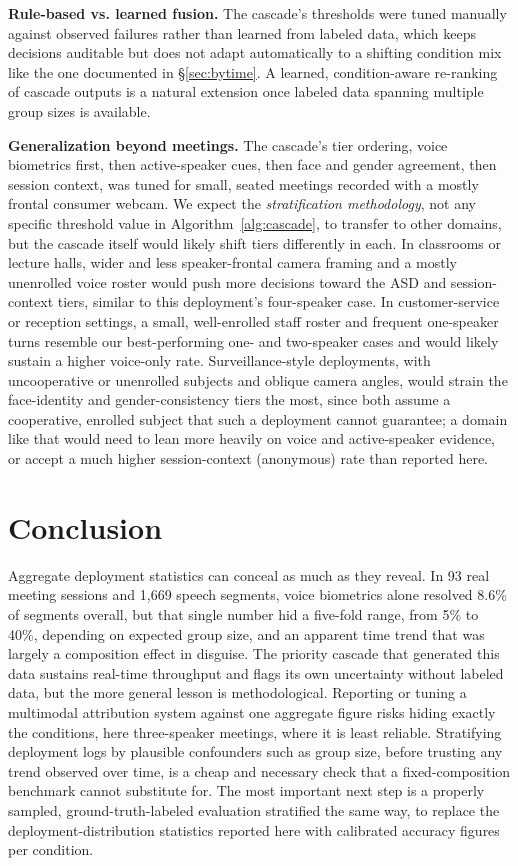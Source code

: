 \documentclass[conference,a4paper]{IEEEtran}
\begin{document}
\textbf{Rule-based vs. learned fusion.} The cascade's thresholds were
tuned manually against observed failures rather than learned from
labeled data, which keeps decisions auditable but does not adapt
automatically to a shifting condition mix like the one documented in
\S\ref{sec:bytime}. A learned, condition-aware re-ranking of cascade
outputs is a natural extension once labeled data spanning multiple
group sizes is available.

\textbf{Generalization beyond meetings.} The cascade's tier ordering,
voice biometrics first, then active-speaker cues, then face and
gender agreement, then session context, was tuned for small, seated
meetings recorded with a mostly frontal consumer webcam. We expect the
\emph{stratification methodology}, not any specific threshold value in
Algorithm~\ref{alg:cascade}, to transfer to other domains, but the
cascade itself would likely shift tiers differently in each. In
classrooms or lecture halls, wider and less speaker-frontal camera
framing and a mostly unenrolled voice roster would push more decisions
toward the ASD and session-context tiers, similar to this deployment's
four-speaker case. In customer-service or reception settings, a small,
well-enrolled staff roster and frequent one-speaker turns resemble our
best-performing one- and two-speaker cases and would likely sustain a
higher voice-only rate. Surveillance-style deployments, with
uncooperative or unenrolled subjects and oblique camera angles, would
strain the face-identity and gender-consistency tiers the most, since
both assume a cooperative, enrolled subject that such a deployment
cannot guarantee; a domain like that would need to lean more heavily
on voice and active-speaker evidence, or accept a much higher
session-context (anonymous) rate than reported here.

\section{Conclusion}

Aggregate deployment statistics can conceal as much as they reveal. In
93 real meeting sessions and 1{,}669 speech segments, voice biometrics
alone resolved 8.6\% of segments overall, but that single number hid a
five-fold range, from 5\% to 40\%, depending on expected group size,
and an apparent time trend that was largely a composition effect in
disguise. The priority cascade that generated this data sustains
real-time throughput and flags its own uncertainty without labeled
data, but the more general lesson is methodological. Reporting or
tuning a multimodal attribution system against one aggregate figure
risks hiding exactly the conditions, here three-speaker meetings,
where it is least reliable. Stratifying deployment logs by plausible
confounders such as group size, before trusting any trend observed
over time, is a cheap and necessary check that a fixed-composition
benchmark cannot substitute for. The most important next step is a
properly sampled, ground-truth-labeled evaluation stratified the same
way, to replace the deployment-distribution statistics reported here
with calibrated accuracy figures per condition.



\end{document}
